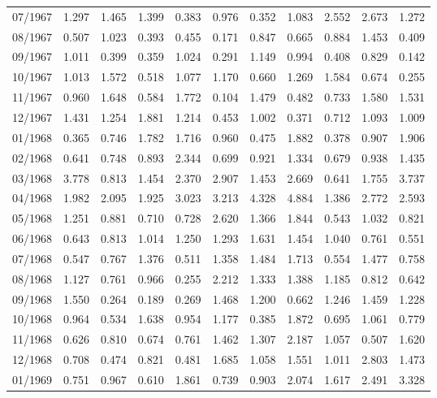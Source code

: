 \begin{tabular}{lrrrrrrrrrr}
07/1967 &  1.297 &  1.465 &  1.399 &  0.383 &  0.976 &  0.352 &  1.083 &  2.552 &  2.673 &  1.272 \\
08/1967 &  0.507 &  1.023 &  0.393 &  0.455 &  0.171 &  0.847 &  0.665 &  0.884 &  1.453 &  0.409 \\
09/1967 &  1.011 &  0.399 &  0.359 &  1.024 &  0.291 &  1.149 &  0.994 &  0.408 &  0.829 &  0.142 \\
10/1967 &  1.013 &  1.572 &  0.518 &  1.077 &  1.170 &  0.660 &  1.269 &  1.584 &  0.674 &  0.255 \\
11/1967 &  0.960 &  1.648 &  0.584 &  1.772 &  0.104 &  1.479 &  0.482 &  0.733 &  1.580 &  1.531 \\
12/1967 &  1.431 &  1.254 &  1.881 &  1.214 &  0.453 &  1.002 &  0.371 &  0.712 &  1.093 &  1.009 \\
01/1968 &  0.365 &  0.746 &  1.782 &  1.716 &  0.960 &  0.475 &  1.882 &  0.378 &  0.907 &  1.906 \\
02/1968 &  0.641 &  0.748 &  0.893 &  2.344 &  0.699 &  0.921 &  1.334 &  0.679 &  0.938 &  1.435 \\
03/1968 &  3.778 &  0.813 &  1.454 &  2.370 &  2.907 &  1.453 &  2.669 &  0.641 &  1.755 &  3.737 \\
04/1968 &  1.982 &  2.095 &  1.925 &  3.023 &  3.213 &  4.328 &  4.884 &  1.386 &  2.772 &  2.593 \\
05/1968 &  1.251 &  0.881 &  0.710 &  0.728 &  2.620 &  1.366 &  1.844 &  0.543 &  1.032 &  0.821 \\
06/1968 &  0.643 &  0.813 &  1.014 &  1.250 &  1.293 &  1.631 &  1.454 &  1.040 &  0.761 &  0.551 \\
07/1968 &  0.547 &  0.767 &  1.376 &  0.511 &  1.358 &  1.484 &  1.713 &  0.554 &  1.477 &  0.758 \\
08/1968 &  1.127 &  0.761 &  0.966 &  0.255 &  2.212 &  1.333 &  1.388 &  1.185 &  0.812 &  0.642 \\
09/1968 &  1.550 &  0.264 &  0.189 &  0.269 &  1.468 &  1.200 &  0.662 &  1.246 &  1.459 &  1.228 \\
10/1968 &  0.964 &  0.534 &  1.638 &  0.954 &  1.177 &  0.385 &  1.872 &  0.695 &  1.061 &  0.779 \\
11/1968 &  0.626 &  0.810 &  0.674 &  0.761 &  1.462 &  1.307 &  2.187 &  1.057 &  0.507 &  1.620 \\
12/1968 &  0.708 &  0.474 &  0.821 &  0.481 &  1.685 &  1.058 &  1.551 &  1.011 &  2.803 &  1.473 \\
01/1969 &  0.751 &  0.967 &  0.610 &  1.861 &  0.739 &  0.903 &  2.074 &  1.617 &  2.491 &  3.328 \\

\end{tabular}
